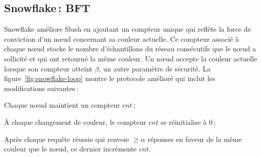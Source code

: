 \documentclass[a4,twocolumn,10pt]{article}
\theoremstyle{definition}
\begin{document}
\subsection{Snowflake\,: BFT}

Snowflake améliore Slush en ajoutant un compteur unique qui reflète la force de conviction d'un nœud concernant sa couleur
actuelle. Ce compteur associé à chaque nœud stocke le nombre d'échantillons du réseau consécutifs que le nœud a
sollicité et qui ont retourné la même couleur. Un nœud accepte la couleur actuelle lorsque son compteur atteint $\beta$,
un autre paramètre de sécurité. La figure~\ref{fig:snowflake-loop} montre le protocole amélioré qui inclut les
modifications suivantes\,:


\begin{compactenum}
	\item Chaque nœud maintient un compteur $\mathit{cnt}$\,;
    \item À chaque changement de couleur, le compteur $\mathit{cnt}$ se réinitialise à 0\,;
    \item Après chaque requête réussie qui renvoie $\ge \alpha$ réponses en faveur de la même couleur que le nœud,
      ce dernier incrémente $\mathit{cnt}$.
\end{compactenum}

\end{document}
